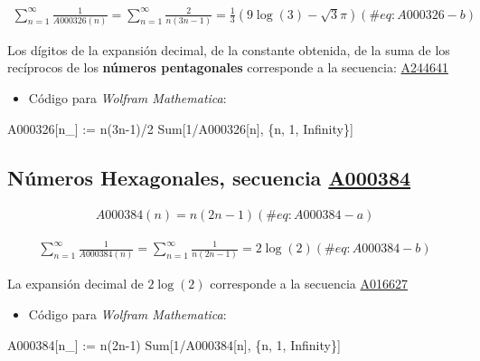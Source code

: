\documentclass[
  letterpaper,
  DIV=11,
  numbers=noendperiod]{scrreprt}
\newenvironment{Shaded}{\begin{snugshade}}{\end{snugshade}}
\newcommand{\NormalTok}[1]{\textcolor[rgb]{0.00,0.23,0.31}{#1}}
\providecommand{\tightlist}{%
  \setlength{\itemsep}{0pt}\setlength{\parskip}{0pt}}\usepackage{longtable,booktabs,array}
\begin{document}
\begin{multline}
\sum_{n=1}^{\infty}{\frac{1}{A000326(n)}} = 
\sum_{n=1}^{\infty}{\frac{2}{n(3n-1)}} =
\frac{1}{3} \left(9 \log (3)-\sqrt{3} \pi \right)
  (\#eq:A000326-b)
\end{multline}

Los dígitos de la expansión decimal, de la constante obtenida, de la
suma de los recíprocos de los \textbf{números pentagonales} corresponde
a la secuencia: \href{https://oeis.org/A244641}{A244641}

\begin{itemize}
\tightlist
\item
  Código para \emph{Wolfram Mathematica}:
\end{itemize}

\begin{Shaded}
\begin{Highlighting}[]
\NormalTok{    A000326[n\_] := n(3n{-}1)/2}
\NormalTok{    Sum[1/A000326[n], \{n, 1, Infinity\}]}
\end{Highlighting}
\end{Shaded}

\hypertarget{nuxfameros-hexagonales-secuencia-a000384}{%
\subsection{\texorpdfstring{Números Hexagonales, secuencia
\href{https://oeis.org/A000384}{A000384}}{Números Hexagonales, secuencia A000384}}\label{nuxfameros-hexagonales-secuencia-a000384}}

\begin{multline}
A000384(n) = n(2n-1)
  (\#eq:A000384-a)
\end{multline}

\begin{multline}
\sum_{n=1}^{\infty}{\frac{1}{A000384(n)}} = 
\sum_{n=1}^{\infty}{\frac{1}{n(2n-1)}} = 
2\log(2)
  (\#eq:A000384-b)
\end{multline}

La expansión decimal de \(2\log(2)\) corresponde a la secuencia
\href{https://oeis.org/A016627}{A016627}

\begin{itemize}
\tightlist
\item
  Código para \emph{Wolfram Mathematica}:
\end{itemize}

\begin{Shaded}
\begin{Highlighting}[]
\NormalTok{    A000384[n\_] := n(2n{-}1)}
\NormalTok{    Sum[1/A000384[n], \{n, 1, Infinity\}]}
\end{Highlighting}
\end{Shaded}
\end{document}
